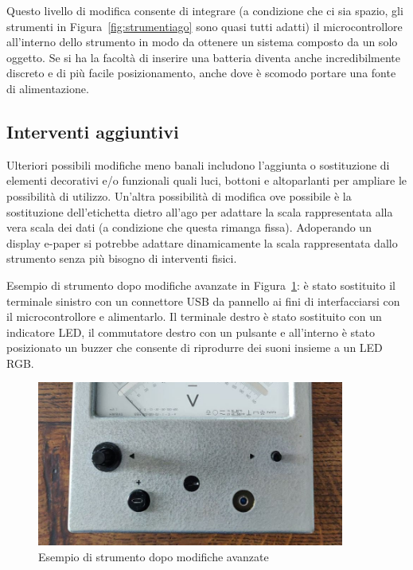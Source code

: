 \documentclass[12pt,a4paper]{report}
\begin{document}
Questo livello di modifica consente di integrare (a condizione che ci sia spazio, gli strumenti in Figura~\ref{fig:strumentiago} sono
quasi tutti adatti) il microcontrollore all'interno dello strumento in modo da ottenere un sistema composto da un solo oggetto.
Se si ha la facoltà di inserire una batteria diventa anche incredibilmente discreto e di più facile posizionamento, anche dove è
scomodo portare una fonte di alimentazione.


\subsection{Interventi aggiuntivi}
Ulteriori possibili modifiche meno banali includono l'aggiunta o sostituzione di elementi decorativi e/o funzionali quali luci, bottoni e
altoparlanti per ampliare le possibilità di utilizzo.
Un'altra possibilità di modifica ove possibile è la sostituzione dell'etichetta dietro all'ago per adattare
la scala rappresentata alla vera scala dei dati (a condizione che questa rimanga fissa). Adoperando un display e-paper si potrebbe
adattare dinamicamente la scala rappresentata dallo strumento senza più bisogno di interventi fisici.

Esempio di strumento dopo modifiche avanzate in Figura~\ref{fig:interventocompleto}:
è stato sostituito il terminale sinistro con un connettore USB da pannello ai fini di interfacciarsi con il microcontrollore e alimentarlo.
Il terminale destro è stato sostituito con un indicatore LED, il commutatore
destro con un pulsante e all'interno è stato posizionato un buzzer che consente di riprodurre dei suoni insieme a un LED RGB.




\begin{figure}[h]
  \centering
  \includegraphics[width=0.9\textwidth]{interventocompleto}
  \caption{Esempio di strumento dopo modifiche avanzate}
  \label{fig:interventocompleto}
\end{figure}
\end{document}
